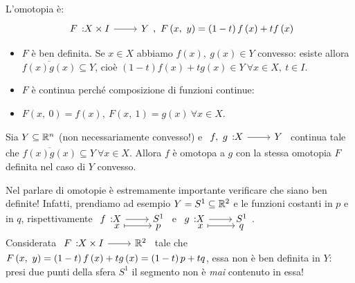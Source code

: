 \begin{demonstration}
	L'omotopia è:
	\begin{equation*}
		\funz{F}{X\times I}{Y},\ \mvf{F}{x}{y}=\left(1-t\right)f\left(x\right)+tf\left(x\right)
	\end{equation*}
\begin{itemize}
	\item $F$ è ben definita. Se $x\in X$ abbiamo $f\left(x\right),\ g\left(x\right)\in Y$ convesso: esiste allora $\overline{f\left(x\right)g\left(x\right)}\subseteq Y$, cioè $\left(1-t\right)f\left(x\right)+tg\left(x\right)\in Y\ \forall x\in X,\ t\in I$.
	\item $F$ è continua perché composizione di funzioni continue:
	\begin{center}
	\end{center}
\item $F\left(x,\ 0\right)=f\left(x\right),\ F\left(x,\ 1\right)=g\left(x\right)\ \forall x\in X$.
\end{itemize}
\end{demonstration}
\begin{observe}\label{omotopiasegmento}
	Sia $Y\subseteq \mathbb{R}^n$ (non necessariamente convesso!) e $\funz{f,\ g}{X}{Y}$ continua tale che $\overline{f\left(x\right)g\left(x\right)}\subseteq Y\ \forall x\in X$. Allora $f$ è omotopa a $g$ con la stessa omotopia $F$ definita nel caso di $Y$ convesso.
\end{observe}
\begin{attention}
Nel parlare di omotopie è estremamente importante verificare che siano ben definite! Infatti, prendiamo ad esempio $Y=S^1\subseteq \mathbb{R}^2$ e le funzioni costanti in $p$ e in $q$, rispettivamente $\funztot{f}{X}{S^1}{x}{p}$ e $\funztot{g}{X}{S^1}{x}{q}$.\\
Considerata $\funz{F}{X\times I}{\realset^2}$ tale che $F\left(x,\ y\right)=\left(1-t\right)f\left(x\right)+tg\left(x\right)=\left(1-t\right)p+tq$, essa non è ben definita in $Y$: presi due punti della sfera $S^1$ il segmento non è \textit{mai} contenuto in essa!
\end{attention}
